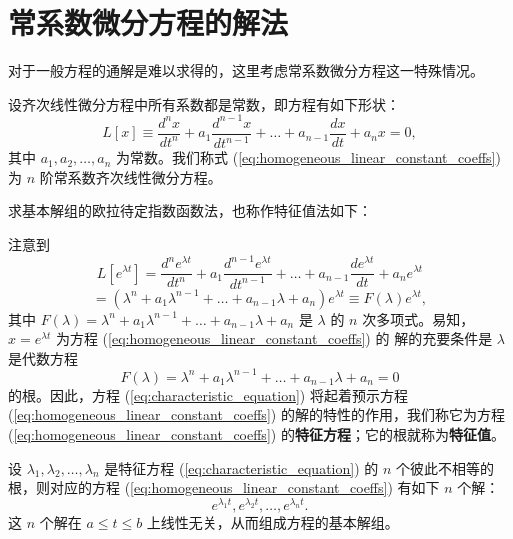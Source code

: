 \section{常系数微分方程的解法}\label{sec:常系数微分方程的解法}
对于一般方程的通解是难以求得的，这里考虑常系数微分方程这一特殊情况。
\begin{definition}[常系数齐次线性微分方程]\label{def:常系数齐次线性微分方程}
    设齐次线性微分方程中所有系数都是常数，即方程有如下形状：
\begin{equation}
L[x] \equiv \frac{d^n x}{dt^n} + a_1\frac{d^{n-1} x}{dt^{n-1}} + \dots + a_{n-1}\frac{dx}{dt} + a_nx=0, \label{eq:homogeneous_linear_constant_coeffs}
\end{equation}
其中 $a_1, a_2, \dots, a_n$ 为常数。我们称式 (\ref{eq:homogeneous_linear_constant_coeffs}) 为 $n$ 阶常系数齐次线性微分方程。
\end{definition}

求基本解组的欧拉待定指数函数法，也称作特征值法如下：
\begin{proposition}[特征值法]\label{prop:特征值法}
    注意到
$$L[e^{\lambda t}] = \frac{d^n e^{\lambda t}}{dt^n} + a_1\frac{d^{n-1} e^{\lambda t}}{dt^{n-1}} + \dots + a_{n-1}\frac{d e^{\lambda t}}{dt} + a_n e^{\lambda t}$$
$$= (\lambda^n+a_1\lambda^{n-1}+\dots+a_{n-1}\lambda+a_n)e^{\lambda t} \equiv F(\lambda)e^{\lambda t},$$
其中 $F(\lambda)=\lambda^n+a_1\lambda^{n-1}+\dots+a_{n-1}\lambda+a_n$ 是 $\lambda$ 的 $n$ 次多项式。易知，$x = e^{\lambda t}$ 为方程 (\ref{eq:homogeneous_linear_constant_coeffs}) 的
解的充要条件是 $\lambda$ 是代数方程
\begin{equation}
F(\lambda) = \lambda^n+a_1\lambda^{n-1}+\dots+a_{n-1}\lambda+a_n = 0 \label{eq:characteristic_equation}
\end{equation}
的根。因此，方程 (\ref{eq:characteristic_equation}) 将起着预示方程 (\ref{eq:homogeneous_linear_constant_coeffs}) 的解的特性的作用，我们称它为方程
(\ref{eq:homogeneous_linear_constant_coeffs}) 的\textbf{特征方程}；它的根就称为\textbf{特征值}。
\end{proposition}

\begin{proposition}[特征值是单根的情形]\label{prop:特征值是单根的情形}
    设 $\lambda_1, \lambda_2, \dots, \lambda_n$ 是特征方程 (\ref{eq:characteristic_equation}) 的 $n$ 个彼此不相等的根，则对应的方程 (\ref{eq:homogeneous_linear_constant_coeffs})
有如下 $n$ 个解：
\begin{equation}
e^{\lambda_1 t}, e^{\lambda_2 t}, \dots, e^{\lambda_n t}. \label{eq:solutions_distinct_roots}
\end{equation}
这 $n$ 个解在 $a \le t \le b$ 上线性无关，从而组成方程的基本解组。
\end{proposition}

